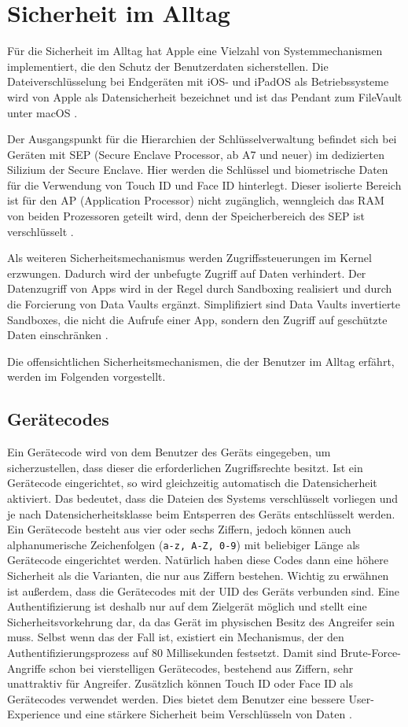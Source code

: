 \section{Sicherheit im Alltag}
Für die Sicherheit im Alltag hat Apple eine Vielzahl von Systemmechanismen implementiert, 
die den Schutz der Benutzerdaten sicherstellen. Die Dateiverschlüsselung bei Endgeräten mit iOS- und 
iPadOS als Betriebssysteme wird von Apple als Datensicherheit bezeichnet und ist das Pendant zum 
FileVault unter macOS \cite{apple2020}.

Der Ausgangspunkt für die Hierarchien der Schlüsselverwaltung befindet sich bei Geräten 
mit SEP (Secure Enclave Processor, ab A7 und neuer) im dedizierten Silizium der Secure Enclave. 
Hier werden die Schlüssel und biometrische Daten für die Verwendung von Touch ID und Face ID 
hinterlegt. Dieser isolierte Bereich ist für den AP (Application Processor) nicht zugänglich, wenngleich 
das RAM von beiden Prozessoren geteilt wird, denn der Speicherbereich des SEP
ist verschlüsselt \cite{apple2020}.

Als weiteren Sicherheitsmechanismus werden Zugriffssteuerungen im Kernel erzwungen. Dadurch wird der unbefugte 
Zugriff auf Daten verhindert. Der Datenzugriff von Apps wird in der Regel durch Sandboxing realisiert und durch die 
Forcierung von Data Vaults ergänzt. Simplifiziert sind Data Vaults invertierte Sandboxes, die nicht die Aufrufe einer App, 
sondern den Zugriff auf geschützte Daten einschränken \cite{apple2020}.

Die offensichtlichen Sicherheitsmechanismen, die der Benutzer im Alltag erfährt, werden im Folgenden vorgestellt.

\subsection{Gerätecodes}
Ein Gerätecode wird von dem Benutzer des Geräts eingegeben, um sicherzustellen,
dass dieser die erforderlichen Zugriffsrechte besitzt. Ist ein Gerätecode
eingerichtet, so wird gleichzeitig automatisch die Datensicherheit aktiviert.
Das bedeutet, dass die Dateien des Systems verschlüsselt vorliegen und je nach
Datensicherheitsklasse beim Entsperren des Geräts entschlüsselt werden. Ein
Gerätecode besteht aus vier oder sechs Ziffern, jedoch können auch
alphanumerische Zeichenfolgen (\texttt{a-z, A-Z, 0-9}) mit beliebiger Länge als
Gerätecode eingerichtet werden. Natürlich haben diese Codes dann eine höhere
Sicherheit als die Varianten, die nur aus Ziffern bestehen. Wichtig zu erwähnen
ist außerdem, dass die Gerätecodes mit der UID des Geräts verbunden sind. Eine
Authentifizierung ist deshalb nur auf dem Zielgerät möglich und stellt eine
Sicherheitsvorkehrung dar, da das Gerät im physischen Besitz des Angreifer sein
muss. Selbst wenn das der Fall ist, existiert ein Mechanismus, der den
Authentifizierungsprozess auf 80 Millisekunden festsetzt. Damit sind
Brute-Force-Angriffe schon bei vierstelligen Gerätecodes, bestehend aus Ziffern,
sehr unattraktiv für Angreifer. Zusätzlich können Touch ID oder Face ID als
Gerätecodes verwendet werden. Dies bietet dem Benutzer eine bessere
User-Experience und eine stärkere Sicherheit beim Verschlüsseln von Daten
\cite{apple2020}.

